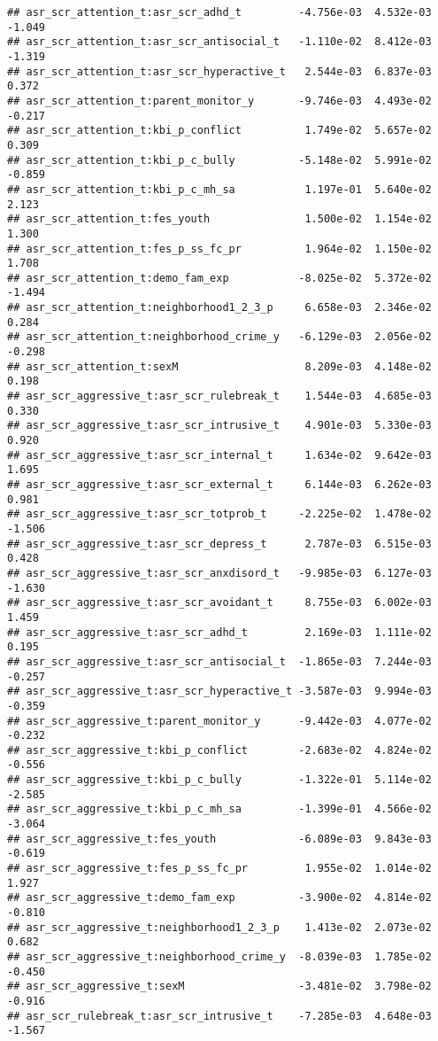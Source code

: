 \documentclass[
]{article}
\begin{document}
\begin{verbatim}
## asr_scr_attention_t:asr_scr_adhd_t         -4.756e-03  4.532e-03  -1.049
## asr_scr_attention_t:asr_scr_antisocial_t   -1.110e-02  8.412e-03  -1.319
## asr_scr_attention_t:asr_scr_hyperactive_t   2.544e-03  6.837e-03   0.372
## asr_scr_attention_t:parent_monitor_y       -9.746e-03  4.493e-02  -0.217
## asr_scr_attention_t:kbi_p_conflict          1.749e-02  5.657e-02   0.309
## asr_scr_attention_t:kbi_p_c_bully          -5.148e-02  5.991e-02  -0.859
## asr_scr_attention_t:kbi_p_c_mh_sa           1.197e-01  5.640e-02   2.123
## asr_scr_attention_t:fes_youth               1.500e-02  1.154e-02   1.300
## asr_scr_attention_t:fes_p_ss_fc_pr          1.964e-02  1.150e-02   1.708
## asr_scr_attention_t:demo_fam_exp           -8.025e-02  5.372e-02  -1.494
## asr_scr_attention_t:neighborhood1_2_3_p     6.658e-03  2.346e-02   0.284
## asr_scr_attention_t:neighborhood_crime_y   -6.129e-03  2.056e-02  -0.298
## asr_scr_attention_t:sexM                    8.209e-03  4.148e-02   0.198
## asr_scr_aggressive_t:asr_scr_rulebreak_t    1.544e-03  4.685e-03   0.330
## asr_scr_aggressive_t:asr_scr_intrusive_t    4.901e-03  5.330e-03   0.920
## asr_scr_aggressive_t:asr_scr_internal_t     1.634e-02  9.642e-03   1.695
## asr_scr_aggressive_t:asr_scr_external_t     6.144e-03  6.262e-03   0.981
## asr_scr_aggressive_t:asr_scr_totprob_t     -2.225e-02  1.478e-02  -1.506
## asr_scr_aggressive_t:asr_scr_depress_t      2.787e-03  6.515e-03   0.428
## asr_scr_aggressive_t:asr_scr_anxdisord_t   -9.985e-03  6.127e-03  -1.630
## asr_scr_aggressive_t:asr_scr_avoidant_t     8.755e-03  6.002e-03   1.459
## asr_scr_aggressive_t:asr_scr_adhd_t         2.169e-03  1.111e-02   0.195
## asr_scr_aggressive_t:asr_scr_antisocial_t  -1.865e-03  7.244e-03  -0.257
## asr_scr_aggressive_t:asr_scr_hyperactive_t -3.587e-03  9.994e-03  -0.359
## asr_scr_aggressive_t:parent_monitor_y      -9.442e-03  4.077e-02  -0.232
## asr_scr_aggressive_t:kbi_p_conflict        -2.683e-02  4.824e-02  -0.556
## asr_scr_aggressive_t:kbi_p_c_bully         -1.322e-01  5.114e-02  -2.585
## asr_scr_aggressive_t:kbi_p_c_mh_sa         -1.399e-01  4.566e-02  -3.064
## asr_scr_aggressive_t:fes_youth             -6.089e-03  9.843e-03  -0.619
## asr_scr_aggressive_t:fes_p_ss_fc_pr         1.955e-02  1.014e-02   1.927
## asr_scr_aggressive_t:demo_fam_exp          -3.900e-02  4.814e-02  -0.810
## asr_scr_aggressive_t:neighborhood1_2_3_p    1.413e-02  2.073e-02   0.682
## asr_scr_aggressive_t:neighborhood_crime_y  -8.039e-03  1.785e-02  -0.450
## asr_scr_aggressive_t:sexM                  -3.481e-02  3.798e-02  -0.916
## asr_scr_rulebreak_t:asr_scr_intrusive_t    -7.285e-03  4.648e-03  -1.567

\end{verbatim}
\end{document}
